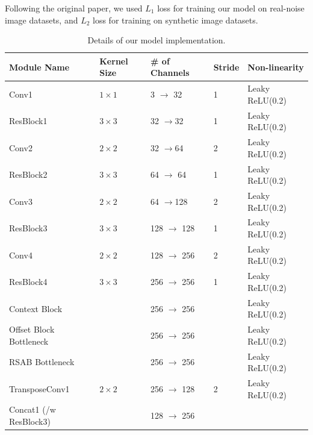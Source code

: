 Following the original paper, we used $L_{1}$ loss for training our model on real-noise image datasets, and $L_{2}$ loss for training on synthetic image datasets.

\begin{table}[t!]
\centering
\caption{Details of our model implementation.}
\label{tab:long}
\begin{tabular}{P|P|P|P|P}
\textbf{Module Name}    & \textbf{Kernel Size} & \textbf{\# of Channels} & \textbf{Stride} & \textbf{Non-linearity} \\ \hline
Conv1                   & $1\times1$           & 3 $\rightarrow$ 32      & 1               & Leaky ReLU(0.2)        \\
ResBlock1               & $3\times3$           & 32 $\rightarrow$32      & 1               & Leaky ReLU(0.2)        \\
Conv2                   & $2\times2$           & 32 $\rightarrow$64      & 2               & Leaky ReLU(0.2)        \\
ResBlock2               & $3\times3$           & 64 $\rightarrow$ 64     & 1               & Leaky ReLU(0.2)        \\
Conv3                   & $2\times2$           & 64 $\rightarrow$128     & 2               & Leaky ReLU(0.2)        \\
ResBlock3               & $3\times3$           & 128 $\rightarrow$ 128   & 1               & Leaky ReLU(0.2)        \\
Conv4                   & $2\times2$           & 128 $\rightarrow$ 256   & 2               & Leaky ReLU(0.2)        \\
ResBlock4               & $3\times3$           & 256 $\rightarrow$ 256   & 1               & Leaky ReLU(0.2)        \\ \hline
Context Block           &                      & 256 $\rightarrow$ 256   &                 & Leaky ReLU(0.2)        \\
Offset Block Bottleneck &                      & 256 $\rightarrow$ 256   &                 & Leaky ReLU(0.2)        \\
RSAB Bottleneck         &                      & 256 $\rightarrow$ 256   &                 & Leaky ReLU(0.2)        \\ \hline
TransposeConv1          & $2\times2$           & 256 $\rightarrow$ 128   & 2               & Leaky ReLU(0.2)        \\
Concat1 (/w ResBlock3)  &                      & 128 $\rightarrow$ 256   &                 &                        \\

\end{tabular}
\end{table}
